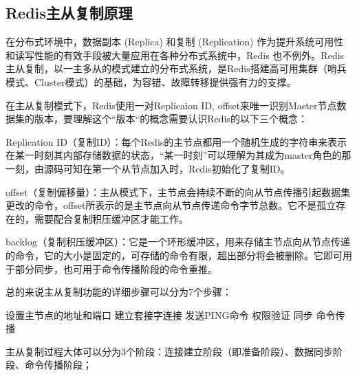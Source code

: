 \documentclass[../../../interview-questions.tex]{subfiles}
\begin{document}
\subsection{Redis主从复制原理}

在分布式环境中，数据副本 (Replica) 和复制 (Replication) 作为提升系统可用性和读写性能的有效手段被大量应用在各种分布式系统中，Redis 也不例外。Redis主从复制，以一主多从的模式建立的分布式系统，是Redis搭建高可用集群（哨兵模式、Cluster模式）的基础，为容错、故障转移提供强有力的支撑。

在主从复制模式下，Redis使用一对Replicaion ID, offset来唯一识别Master节点数据集的版本，要理解这个“版本“的概念需要认识Redis的以下三个概念：

Replication ID（复制ID）：每个Redis的主节点都用一个随机生成的字符串来表示在某一时刻其内部存储数据的状态，“某一时刻”可以理解为其成为master角色的那一刻，由源码可知在第一个从节点加入时，Redis初始化了复制ID。

offset（复制偏移量）：主从模式下，主节点会持续不断的向从节点传播引起数据集更改的命令，offset所表示的是主节点向从节点传递命令字节总数。它不是孤立存在的，需要配合复制积压缓冲区才能工作。

backlog（复制积压缓冲区）：它是一个环形缓冲区，用来存储主节点向从节点传递的命令，它的大小是固定的，可存储的命令有限，超出部分将会被删除。它即可用于部分同步，也可用于命令传播阶段的命令重推。



总的来说主从复制功能的详细步骤可以分为7个步骤：

设置主节点的地址和端口
建立套接字连接
发送PING命令
权限验证
同步
命令传播

主从复制过程大体可以分为3个阶段：连接建立阶段（即准备阶段）、数据同步阶段、命令传播阶段；
\end{document}
